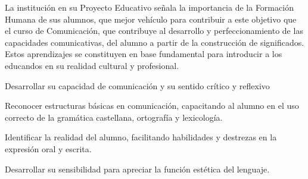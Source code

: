 \begin{syllabus}


\begin{justification}
La institución en su Proyecto Educativo señala la importancia de la Formación Humana de sus alumnos, que mejor vehículo para contribuir a este objetivo que el curso de Comunicación, que contribuye al desarrollo y perfeccionamiento de las capacidades comunicativas, del alumno a partir de la construcción de significados. Estos aprendizajes se constituyen en base fundamental para introducir a los educandos en su realidad cultural y profesional.
\end{justification}

\begin{goals}
\item Desarrollar su capacidad de comunicación y su sentido crítico y reflexivo
\item Reconocer estructuras básicas en comunicación, capacitando al alumno en el uso correcto de la gramática castellana, ortografía y lexicología.
\item Identificar la realidad del alumno, facilitando habilidades y destrezas en la expresión oral y escrita.
\item Desarrollar su sensibilidad para apreciar la función estética del lenguaje.
\end{goals}

\begin{outcomes}
\end{outcomes}


\end{syllabus}
